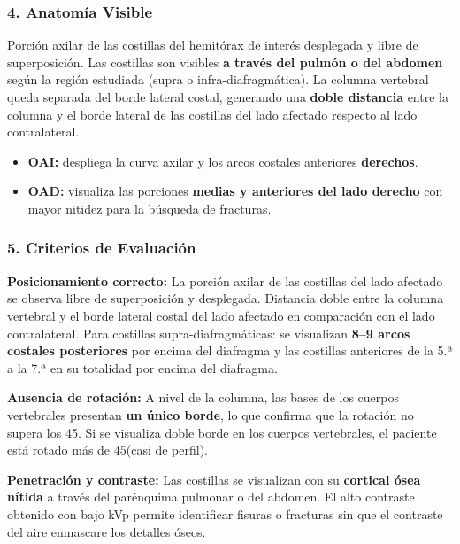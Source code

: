 	\subsubsection*{4. Anatomía Visible}
	
	Porción axilar de las costillas del hemitórax de interés desplegada y libre de
	superposición. Las costillas son visibles \textbf{a través del pulmón o del
		abdomen} según la región estudiada (supra o infra-diafragmática). La columna
	vertebral queda separada del borde lateral costal, generando una \textbf{doble
		distancia} entre la columna y el borde lateral de las costillas del lado
	afectado respecto al lado contralateral.
	
	\begin{itemize}
		\item \textbf{OAI:} despliega la curva axilar y los arcos costales anteriores
		\textbf{derechos}.
		\item \textbf{OAD:} visualiza las porciones \textbf{medias y anteriores del
			lado derecho} con mayor nitidez para la búsqueda de fracturas.
	\end{itemize}
	
	\subsubsection*{5. Criterios de Evaluación}
	
	\textbf{Posicionamiento correcto:} La porción axilar de las costillas del lado
	afectado se observa libre de superposición y desplegada. Distancia doble entre
	la columna vertebral y el borde lateral costal del lado afectado en comparación
	con el lado contralateral. Para costillas supra-diafragmáticas: se visualizan
	\textbf{8--9 arcos costales posteriores} por encima del diafragma y las
	costillas anteriores de la 5.ª a la 7.ª en su totalidad por encima del
	diafragma.
	
	\textbf{Ausencia de rotación:} A nivel de la columna, las bases de los cuerpos
	vertebrales presentan \textbf{un único borde}, lo que confirma que la rotación
	no supera los 45\textdegree. Si se visualiza doble borde en los cuerpos
	vertebrales, el paciente está rotado más de 45\textdegree (casi de perfil).
	
	\textbf{Penetración y contraste:} Las costillas se visualizan con su
	\textbf{cortical ósea nítida} a través del parénquima pulmonar o del abdomen.
	El alto contraste obtenido con bajo kVp permite identificar fisuras o fracturas
	sin que el contraste del aire enmascare los detalles óseos.
	
